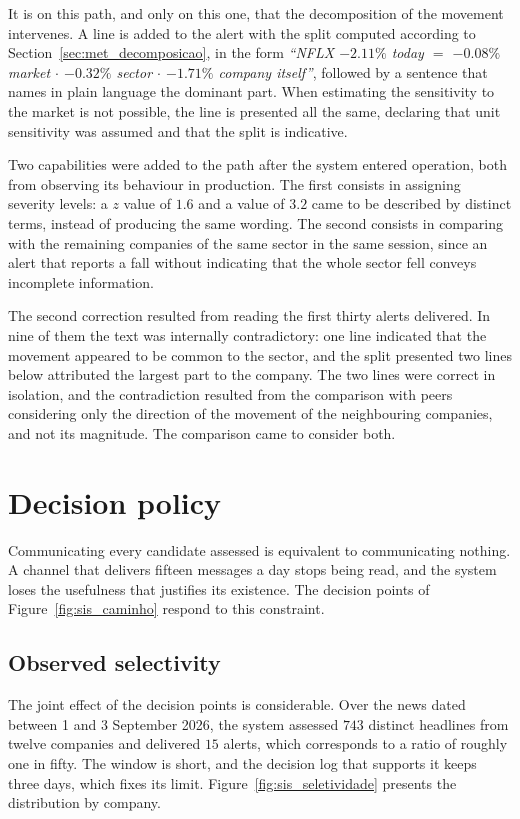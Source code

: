 It is on this path, and only on this one, that the decomposition of the movement intervenes. A line
is added to the alert with the split computed according to Section~\ref{sec:met_decomposicao}, in
the form \emph{``NFLX $-2.11\%$ today $=$ $-0.08\%$ market $\cdot$ $-0.32\%$ sector $\cdot$
$-1.71\%$ company itself''}, followed by a sentence that names in plain language the dominant part.
When estimating the sensitivity to the market is not possible, the line is presented all the same,
declaring that unit sensitivity was assumed and that the split is indicative.

Two capabilities were added to the path after the system entered operation, both from observing its
behaviour in production. The first consists in assigning severity levels: a $z$ value of $1.6$ and a
value of $3.2$ came to be described by distinct terms, instead of producing the same wording. The
second consists in comparing with the remaining companies of the same sector in the same session,
since an alert that reports a fall without indicating that the whole sector fell conveys incomplete
information.

The second correction resulted from reading the first thirty alerts delivered. In nine of them the
text was internally contradictory: one line indicated that the movement appeared to be common to
the sector, and the split presented two lines below attributed the largest part to the company. The
two lines were correct in isolation, and the contradiction resulted from the comparison with peers
considering only the direction of the movement of the neighbouring companies, and not its
magnitude. The comparison came to consider both.

\section{Decision policy}
\label{sec:sis_politica}

Communicating every candidate assessed is equivalent to communicating nothing. A channel that
delivers fifteen messages a day stops being read, and the system loses the usefulness that
justifies its existence. The decision points of Figure~\ref{fig:sis_caminho} respond to this
constraint.

\subsection{Observed selectivity}

The joint effect of the decision points is considerable. Over the news dated between 1 and 3
September 2026, the system assessed $743$ distinct headlines from twelve companies and delivered
$15$ alerts, which corresponds to a ratio of roughly one in fifty. The window is short, and the
decision log that supports it keeps three days, which fixes its limit.
Figure~\ref{fig:sis_seletividade} presents the distribution by company.

